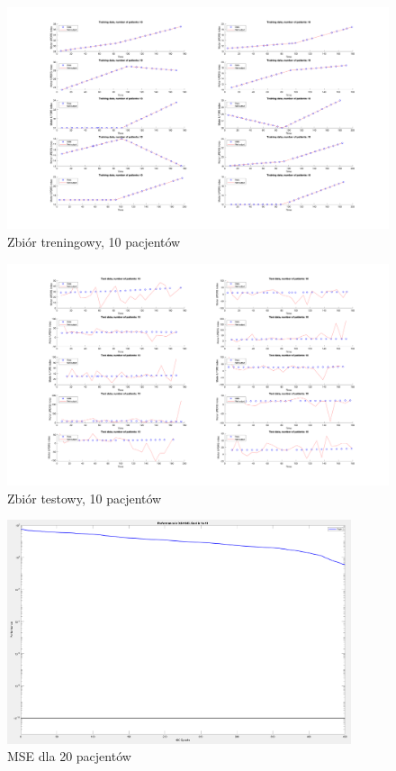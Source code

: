 \documentclass[12pt]{article}
\begin{document}
\begin{figure}[h!]

\centering
\includegraphics[width=1.05\textwidth]{training-cut-10.png}
\caption{Zbiór treningowy, 10 pacjentów}

\end{figure}

\begin{figure}[h!]

\centering
\includegraphics[width=1.0\textwidth]{test-cut-10.png}
\caption{Zbiór testowy, 10 pacjentów}

\end{figure}

\begin{figure}[h!]

\centering
\includegraphics[width=0.9\textwidth]{mse-cut-20.png}
\caption{MSE dla 20 pacjentów}

\end{figure}
\end{document}
